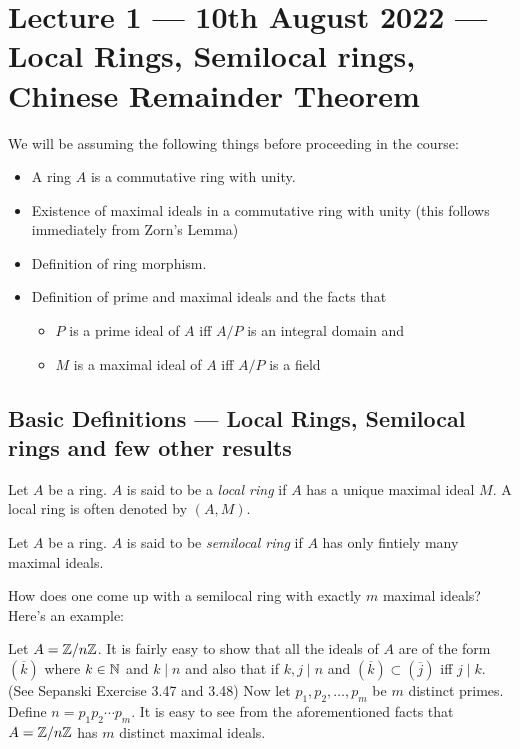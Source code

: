 \section{Lecture 1 --- 10th August 2022 --- Local Rings, Semilocal rings, Chinese Remainder Theorem}

We will be assuming the following things before proceeding in the course:
\begin{itemize}
    \item A ring $A$ is a commutative ring with unity.
    \item Existence of maximal ideals in a commutative ring with unity (this follows immediately from Zorn's Lemma)
    \item Definition of ring morphism.
    \item Definition of prime and maximal ideals and the facts that
	\begin{itemize}
	    \item $P$ is a prime ideal of $A$ iff $A/P$ is an integral domain and
	    \item $M$ is a maximal ideal of $A$ iff $A/P$ is a field
	\end{itemize}
\end{itemize}

\subsection{Basic Definitions --- Local Rings, Semilocal rings and few other results}

\begin{definition}
    Let $A$ be a ring. $A$ is said to be a \textit{local ring} if $A$ has a unique maximal ideal $M$. A local ring is often denoted by $(A,M)$. 
    \label{def:local-ring}
\end{definition}

\begin{definition}
    Let $A$ be a ring. $A$ is said to be \textit{semilocal ring} if $A$ has only fintiely many maximal ideals.
    \label{def:semilocal-ring}
\end{definition}

How does one come up with a semilocal ring with exactly $m$ maximal ideals? Here's an example:
\begin{example}
    Let $A= \mathbb Z / n\mathbb Z$. It is fairly easy to show that all the ideals of $A$ are of the form $\left( \overline k \right)$ where $k\in\mathbb N$ and $k\mid n$ and also that if $k,j \mid n$ and $\left( \overline k \right) \subset \left( \overline j \right)$ iff $j\mid k$. (See Sepanski Exercise 3.47 and 3.48) Now let $p_1 , p_2 , \ldots ,  p_m$ be $m$ distinct primes. Define $n=p_1 p_2 \cdots p_m$. It is easy to see from the aforementioned facts that $A = \mathbb Z / n\mathbb Z$ has $m $ distinct maximal ideals.
\end{example}


